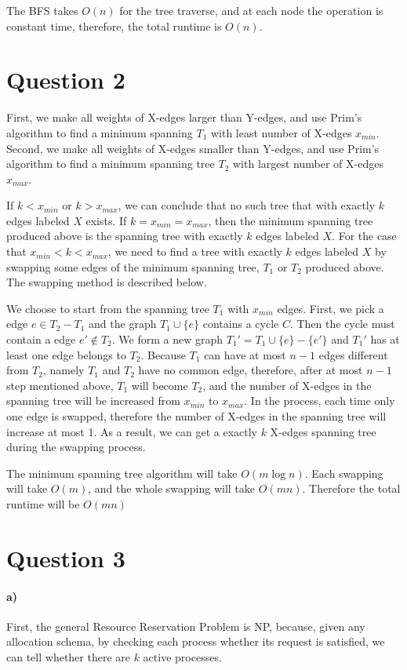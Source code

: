 \documentclass[letter,12pt]{article}
\begin{document}
The BFS takes $O(n)$ for the tree traverse, and at each node the operation is constant
time, therefore, the total runtime is $O(n)$.

\section*{Question 2}
First, we make all weights of X-edges larger than Y-edges, and use Prim's algorithm
to find a minimum spanning $T_1$ with least number of X-edges $x_{min}$. Second, 
we make all weights of X-edges smaller than Y-edges, and use Prim's algorithm to find 
a minimum spanning tree $T_2$ with largest number of X-edges $x_{max}$.

If $k < x_{min}$ or $k>x_{max}$, we can conclude that no such tree that with exactly 
$k$ edges labeled $X$ exists. If $k = x_{min} = x_{max}$, then the minimum spanning 
tree produced above is the spanning tree with exactly $k$ edges labeled $X$. For the
case that $x_{min} < k < x_{max}$, we need to find a tree with exactly $k$ edges 
labeled $X$ by swapping some edges of the minimum spanning tree, $T_1$ or $T_2$ 
produced above. The swapping method is described below.

We choose to start from the spanning tree $T_1$ with $x_{min}$ edges. First, we pick a 
edge $e \in T_2 - T_1$ and the graph $T_1 \cup \{e\}$ contains a cycle $C$. Then 
the cycle must contain a edge $e' \notin T_2$. We form a new graph $T_1' = T_1 \cup 
\{e\} -\{e'\}$ and $T_1'$ has at least one edge belongs to $T_2$. Because $T_1$ can 
have at most $n-1$ edges different from $T_2$, namely $T_1$ and $T_2$ have no
common edge, therefore, after at most $n-1$ step mentioned above, $T_1$ will 
become $T_2$, and the number of X-edges in the spanning tree will be increased from
$x_{min}$ to $x_{max}$. In the process, each time only one edge is swapped, therefore
the number of X-edges in the spanning tree will increase at most 1. As a result, we can
get a exactly $k$ X-edges spanning tree during the swapping process.

The minimum spanning tree algorithm will take $O(m\log n)$. Each swapping will
take $O(m)$, and the whole swapping will take $O(mn)$. Therefore the total runtime
will be $O(mn)$

\section*{Question 3}
\paragraph*{a)}First, the general Resource Reservation Problem is NP, because, given any allocation schema, by checking each process whether its request is satisfied, we 
can tell whether there are $k$ active processes.
\end{document}
